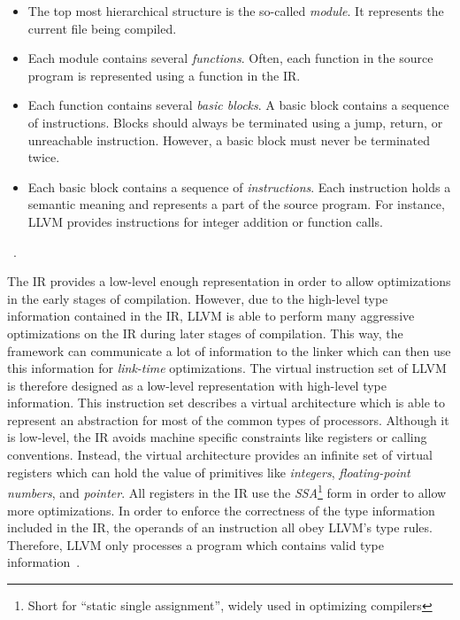 \begin{itemize}
	\item The top most hierarchical structure is the so-called \emph{module}.
	      It represents the current file being compiled.
	\item Each module contains several \emph{functions}.
	      Often, each function in the source program is represented using a function in the IR\@.
	\item Each function contains several \emph{basic blocks}.
	      A basic block contains a sequence of instructions.
	      Blocks should always be terminated using a jump, return, or unreachable instruction.
	      However, a basic block must never be terminated twice.
	\item Each basic block contains a sequence of \emph{instructions}.
	      Each instruction holds a semantic meaning and represents a part of the source program.
          For instance, LLVM provides instructions for integer addition or function calls.
\end{itemize}~\cite[p.~211-213]{Hsu2021-ez}.

The IR provides a low-level enough representation in order to allow optimizations in the early stages of compilation.
However, due to the high-level type information contained in the IR,
LLVM is able to perform many aggressive optimizations on the IR during later stages of compilation.
This way, the framework can communicate a lot of information to the linker which can then use this information for \emph{link-time} optimizations.
The virtual instruction set of LLVM is therefore designed as a low-level representation with high-level type information.
This instruction set describes a virtual architecture which is able to represent an abstraction for most of the common types of processors.
Although it is low-level, the IR avoids machine specific constraints like registers or calling conventions.
Instead, the virtual architecture provides an infinite set of virtual registers which can hold the value of primitives like \emph{integers}, \emph{floating-point numbers}, and \emph{pointer}.
All registers in the IR use the \emph{SSA}\footnote{Short for \enquote{static single assignment}, widely used in optimizing compilers} form in order to allow more optimizations.
In order to enforce the correctness of the type information included in the IR,
the operands of an instruction all obey LLVM's type rules.
Therefore, LLVM only processes a program which contains valid type information~\cite[p.~14-17]{Lattner:MSThesis02}.


